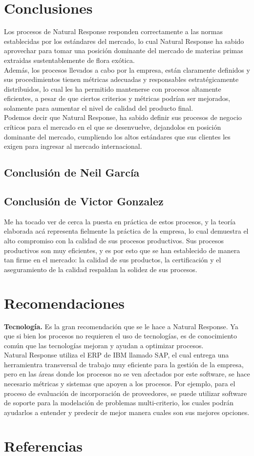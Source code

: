 \documentclass[12pt,letterpaper]{article}
\begin{document}
\section{Conclusiones}
Los procesos de Natural Response responden correctamente a las normas establecidas por los estándares del mercado, lo cual Natural Response ha sabido aprovechar para tomar una posición dominante del mercado de materias primas extraidas sustentablemente de flora exótica.\\

Además, los procesos llevados a cabo por la empresa, están claramente definidos y sus procedimientos tienen métricas adecuadas y responsables estratégicamente distribuidos, lo cual les ha permitido mantenerse con procesos altamente eficientes, a pesar de que ciertos criterios y métricas podrían ser mejorados, solamente para aumentar el nivel de calidad del producto final.\\

Podemos decir que Natural Response, ha sabido definir sus procesos de negocio críticos para el mercado en el que se desenvuelve, dejandolos en posición dominante del mercado, cumpliendo los altos estándares que sus clientes les exigen para ingresar al mercado internacional.

\subsection{Conclusión de Neil García}

\subsection{Conclusión de Victor Gonzalez}
Me ha tocado ver de cerca la puesta en práctica de estos procesos, y la teoría elaborada acá representa fielmente la práctica de la empresa, lo cual demuestra el alto compromiso con la calidad de sus procesos productivos. Sus procesos productivos son muy eficientes, y es por esto que se han establecido de manera tan firme en el mercado: la calidad de sus productos, la certificación y el aseguramiento de la calidad respaldan la solidez de sus procesos.\\

\section{Recomendaciones}
\textbf{Tecnología.} Es la gran recomendación que se le hace a Natural Response. Ya que si bien los procesos no requieren el uso de tecnologías, es de conocimiento común que las tecnologías mejoran y ayudan a optimizar procesos.\\
Natural Response utiliza el ERP de IBM llamado SAP, el cual entrega una herramientra transversal de trabajo muy eficiente para la gestión de la empresa, pero en las áreas donde los procesos no se ven afectados por este software, se hace necesario métricas y sistemas que apoyen a los procesos. Por ejemplo, para el proceso de evaluación de incorporación de proveedores, se puede utilizar software de soporte para la modelación de problemas multi-criterio, los cuales podrán ayudarlos a entender y predecir de mejor manera cuales son sus mejores opciones.

\section{Referencias}
\end{document}
